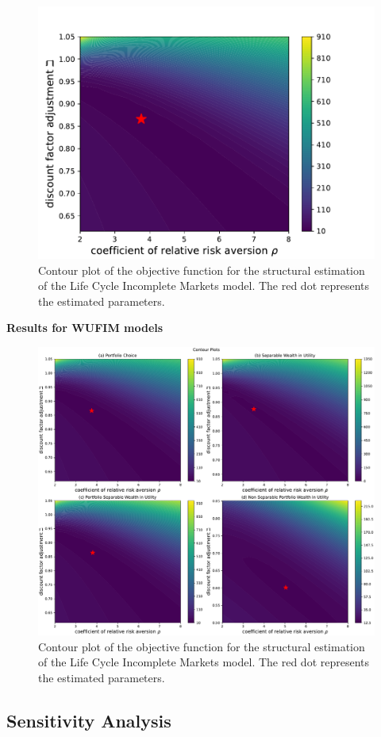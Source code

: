 \documentclass{article}
\begin{document}
\begin{figure}[!htbp]
\centering
\includegraphics[width=0.7\linewidth]{files/IndShockSMMcontour-f950f8faf8926e47605d36d01964a2f6.pdf}
\caption{Contour plot of the objective function for the structural estimation of the Life Cycle Incomplete Markets model. The red dot represents the estimated parameters.}
\label{fig:IndShockSMMcontour}
\end{figure}

\textbf{Results for WUFIM models}

\begin{figure}[!htbp]
\centering
\includegraphics[width=0.7\linewidth]{files/AllSMMcontour-61083533183861c53042688308f7803e.pdf}
\caption{Contour plot of the objective function for the structural estimation of the Life Cycle Incomplete Markets model. The red dot represents the estimated parameters.}
\label{fig:AllSMMcontour}
\end{figure}

\subsection{Sensitivity Analysis}\label{Sensitivity Analysis}
\end{document}
